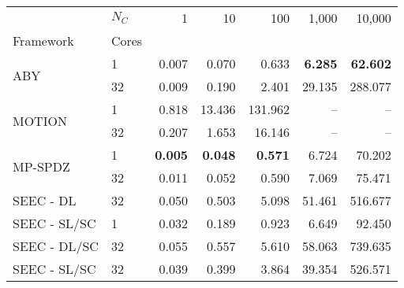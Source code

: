 \begin{tabular}{llrrrrr}
\toprule
 & $N_C$ & 1 & 10 & 100 & 1,000 & 10,000 \\
Framework & Cores &  &  &  &  &  \\
\midrule
\multirow[c]{2}{*}{ABY~\cite{DSZ15}} & 1 & 0.007 & 0.070 & 0.633 & \bfseries 6.285 & \bfseries 62.602 \\
 & 32 & 0.009 & 0.190 & 2.401 & 29.135 & 288.077 \\
\cline{1-7}
\multirow[c]{2}{*}{MOTION~\cite{BDST22}} & 1 & 0.818 & 13.436 & 131.962 & -- & -- \\
 & 32 & 0.207 & 1.653 & 16.146 & -- & -- \\
\cline{1-7}
\multirow[c]{2}{*}{MP-SPDZ~\cite{CCS:Keller20}} & 1 & \bfseries 0.005 & \bfseries 0.048 & \bfseries 0.571 & 6.724 & 70.202 \\
 & 32 & 0.011 & 0.052 & 0.590 & 7.069 & 75.471 \\
\cline{1-7}
SEEC - DL & 32 & 0.050 & 0.503 & 5.098 & 51.461 & 516.677 \\
\cline{1-7}
SEEC - SL/SC & 1 & 0.032 & 0.189 & 0.923 & 6.649 & 92.450 \\
\cline{1-7}
SEEC - DL/SC & 32 & 0.055 & 0.557 & 5.610 & 58.063 & 739.635 \\
\cline{1-7}
SEEC - SL/SC & 32 & 0.039 & 0.399 & 3.864 & 39.354 & 526.571 \\
\bottomrule
\end{tabular}
